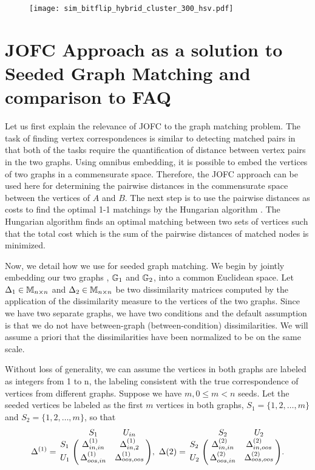 \documentclass[12pt,oneside,final]{thesis}\usepackage[]{graphicx}\usepackage[]{color}
\begin{document}
\begin{figure}
 \centering
  \caption{
 \label{fig:hybrid}}
 \texttt{[image: sim\_bitflip\_hybrid\_cluster\_300\_hsv.pdf]}
\end{figure}



\chapter{JOFC Approach as a solution to Seeded Graph Matching and comparison to FAQ}
\label{sec:sgm-jofc}


Let us first explain the relevance of JOFC to the graph matching problem. The  task of finding vertex correspondences is similar to  detecting matched pairs in that both of the tasks require the quantification of distance between vertex pairs  in the two graphs.
Using omnibus  embedding, it is possible to embed the vertices of two graphs in a commensurate space.
Therefore, the JOFC approach can be used here for determining the pairwise distances in the commensurate space between  the vertices of $A$ and $B$.
The next step is to use the pairwise distances as costs to find the optimal 1-1 matchings by the Hungarian algorithm \cite{Hung-algo}. The Hungarian algorithm finds an optimal matching between two sets of vertices such that the total  cost which is the sum of the pairwise distances of matched nodes is minimized.

Now, we detail how we use for seeded graph matching. We begin by jointly embedding our two graphs , $\mathbb{G}_1$ and $\mathbb{G}_2$, into a common Euclidean space. Let $\Delta_1\in \mathbb{M}_{n \times n}$ and $\Delta_2\in \mathbb{M}_{n \times n}$ be two dissimilarity matrices computed by the application of the dissimilarity measure to the vertices of the two graphs. Since we have two separate graphs, we have two conditions and the default assumption is that we do not have  between-graph (between-condition) dissimilarities. We will assume a priori that the dissimilarities have been normalized to be on the same scale.

Without loss of generality, we can assume the vertices in both graphs are labeled as integers  from 1 to n, the labeling consistent with the true correspondence  of vertices from different graphs. Suppose we have $m, 0 \leq m <n$ seeds. Let the seeded vertices be labeled  as the first $m$ vertices in both graphs, $S_1=\{1,2,\ldots,m\}$ and $S_2=\{1,2,\ldots,m\}$, so that 
$$\Delta^{(1)}=\bordermatrix{&S_{1}&U_{in}\cr
                S_1&\gD^{(1)}_{{in},{in}} 
                & \gD^{(1)}_{{in},2}  \cr
                U_1& \gD^{(1)}_{{oos},{in}}  
                &  \gD^{(1)}_{{oos},{oos}}},\,\,
                \Delta{(2)}=\bordermatrix{&S_2&U_2\cr
                S_2&\gD^{(2)}_{{in},{in}} 
                & \gD^{(2)}_{{in},{oos}}  \cr
                U_2& \gD^{(2)}_{{oos},{in}}  
                &  \gD^{(2)}_{{oos},{oos}}}.$$
\end{document}
